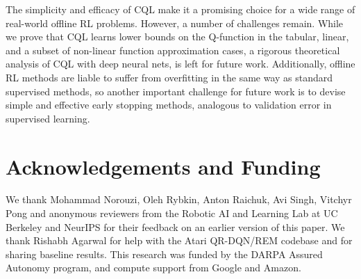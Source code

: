 \documentclass[../thesis.tex]{subfiles}
\begin{document}
The simplicity and efficacy of CQL make it a promising choice for a wide range of real-world offline RL problems. However, a number of challenges remain. While we prove that CQL learns lower bounds on the Q-function in the tabular, linear, and a subset of non-linear function approximation cases, a rigorous theoretical analysis of CQL with deep neural nets, is left for future work. Additionally, offline RL methods are liable to suffer from overfitting in the same way as standard supervised methods, so another important challenge for future work is to devise simple and effective early stopping methods, analogous to validation error in supervised learning.

\section*{Acknowledgements and Funding}
We thank Mohammad Norouzi, Oleh Rybkin, Anton Raichuk, Avi Singh, Vitchyr Pong and anonymous reviewers from the Robotic AI and Learning Lab at UC Berkeley and NeurIPS for their feedback on an earlier version of this paper. We thank Rishabh Agarwal for help with the Atari QR-DQN/REM codebase and for sharing baseline results. This research was funded by the DARPA Assured Autonomy program, and compute support from Google and Amazon.
\end{document}
